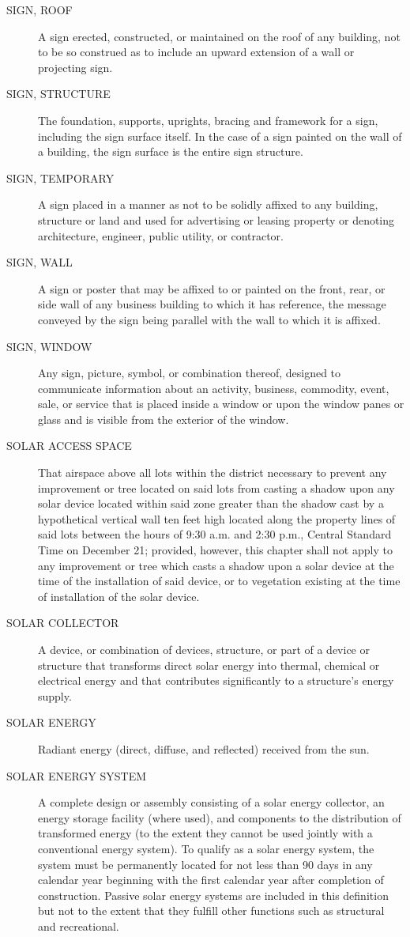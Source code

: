 \begin{description}
    \item[SIGN, ROOF] A sign erected, constructed, or maintained on the roof of any building, not to be so construed as to include an upward extension of a wall or projecting sign.
    \item[SIGN, STRUCTURE] The foundation, supports, uprights, bracing and framework for a sign, including the sign surface itself.  In the case of a sign painted on the wall of a building, the sign surface is the entire sign structure.
    \item[SIGN, TEMPORARY] A sign placed in a manner as not to be solidly affixed to any building, structure or land and used for advertising or leasing property or denoting architecture, engineer, public utility, or contractor.
    \item[SIGN, WALL] A sign or poster that may be affixed to or painted on the front, rear, or side wall of any business building to which it has reference, the message conveyed by the sign being parallel with the wall to which it is affixed.
    \item[SIGN, WINDOW] Any sign, picture, symbol, or combination thereof, designed to communicate information about an activity, business, commodity, event, sale, or service that is placed inside a window or upon the window panes or glass and is visible from the exterior of the window.
    \item[SOLAR ACCESS SPACE] That airspace above all lots within the district necessary to prevent any improvement or tree located on said lots from casting a shadow upon any solar device located within said zone greater than the shadow cast by a hypothetical vertical wall ten feet high located along the property lines of said lots between the hours of 9:30 a.m. and 2:30 p.m., Central Standard Time on December 21; provided, however, this chapter shall not apply to any improvement or tree which casts a shadow upon a solar device at the time of the installation of said device, or to vegetation existing at the time of installation of the solar device.
    \item[SOLAR COLLECTOR] A device, or combination of devices, structure, or part of a device or structure that transforms direct solar energy into thermal, chemical or electrical energy and that contributes significantly to a structure’s energy supply.
    \item[SOLAR ENERGY] Radiant energy (direct, diffuse, and reflected) received from the sun.
    \item[SOLAR ENERGY SYSTEM] A complete design or assembly consisting of a solar energy collector, an energy storage facility (where used), and components to the distribution of transformed energy (to the extent they cannot be used jointly with a conventional energy system). To qualify as a solar energy system, the system must be permanently located for not less than 90 days in any calendar year beginning with the first calendar year after completion of construction. Passive solar energy systems are included in this definition but not to the extent that they fulfill other functions such as structural and recreational.

\end{description}
